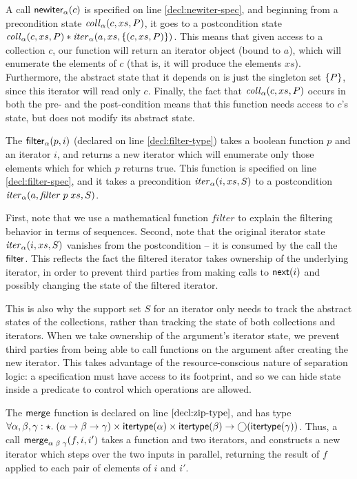 A call $\mathsf{newiter}_\alpha(c)$ is specified on line
\ref{decl:newiter-spec}, and beginning from a precondition state
$\mathit{coll}_\alpha(c, xs, P)$, it goes to a postcondition state
$\mathit{coll}_\alpha(c, xs, P) * \mathit{iter}_\alpha(a, xs, \{{(c, xs, P)}\})$.
This means that given access to a collection $c$, our function will
return an iterator object (bound to $a$), which will enumerate the
elements of $c$ (that is, it will produce the elements
$xs$). Furthermore, the abstract state that it depends on is just the
singleton set $\{{P}\}$, since this iterator will read only $c$.
Finally, the fact that $\mathit{coll}_\alpha(c, xs, P)$ occurs in both
the pre- and the post-condition means that this function needs 
access to $c$'s state, but does not modify its abstract state. 

The $\mathsf{filter}_\alpha(p, i)$ (declared on line \ref{decl:filter-type})
takes a boolean function $p$ and an iterator $i$, and returns a new
iterator which will enumerate only those elements which for which $p$
returns true. This function is specified on line \ref{decl:filter-spec}, 
and it takes a precondition $\mathit{iter}_\alpha(i, xs, S)$ to a postcondition
$\mathit{iter}_\alpha(a, \mathit{filter}\;p\;xs, S)$. 

First, note that we use a mathematical function $\mathit{filter}$ to
explain the filtering behavior in terms of sequences. Second, note
that the original iterator state $\mathit{iter}_\alpha(i, xs, S)$ vanishes
from the postcondition -- it is consumed by the call the
$\mathsf{filter}$.  This reflects the fact the filtered iterator takes
ownership of the underlying iterator, in order to prevent third
parties from making calls to $\mathsf{next}(i)$ and possibly changing the
state of the filtered iterator.

This is also why the support set $S$ for an iterator only needs to
track the abstract states of the collections, rather than tracking the
state of both collections and iterators. When we take ownership of the
argument's iterator state, we prevent third parties from being able to
call functions on the argument after creating the new iterator. This
takes advantage of the resource-conscious nature of separation logic:
a specification must have access to its footprint, and so we can hide
state inside a predicate to control which operations are allowed.

The $\mathsf{merge}$ function is declared on line $\ref{decl:zip-type}$, and
has type $\forall \alpha,\beta,\gamma:\star.\; (\alpha \to \beta \to \gamma) \times \mathsf{itertype}(\alpha) \times
\mathsf{itertype}(\beta) \to \bigcirc{(\mathsf{itertype}(\gamma))}$.  Thus,
a call $\mathsf{merge}_{\alpha\;\beta\;\gamma}(f, i, i')$ takes a function and two 
iterators, and constructs a new iterator which steps over the two inputs in parallel,
returning the result of $f$ applied to each pair of elements of $i$ and $i'$. 

